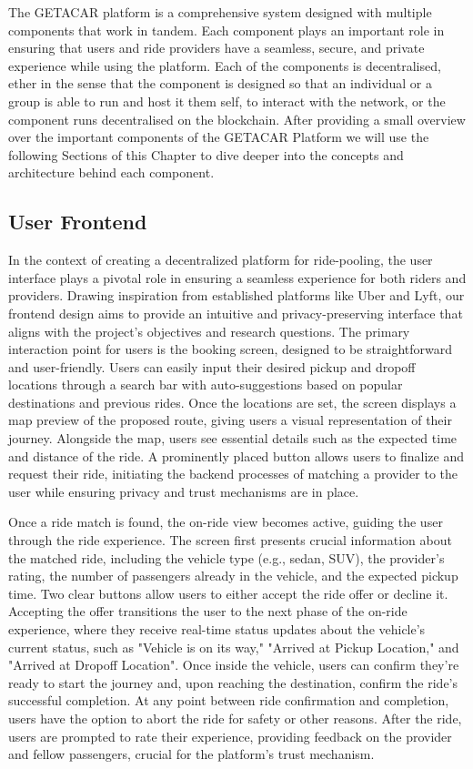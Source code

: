 The GETACAR platform is a comprehensive system designed with multiple components that work in tandem. Each component plays an important role in ensuring that users and ride providers have a seamless, secure, and private experience while using the platform. Each of the components is decentralised, ether in the sense that the component is designed so that an individual or a group is able to run and host it them self, to interact with the network, or the component runs decentralised on the blockchain. After providing a small overview over the important components of the GETACAR Platform we will use the following Sections of this Chapter to dive deeper into the concepts and architecture behind each component. 

\subsection{User Frontend}
In the context of creating a decentralized platform for ride-pooling, the user interface plays a pivotal role in ensuring a seamless experience for both riders and providers. Drawing inspiration from established platforms like Uber and Lyft, our frontend design aims to provide an intuitive and privacy-preserving interface that aligns with the project's objectives and research questions. The primary interaction point for users is the booking screen, designed to be straightforward and user-friendly. Users can easily input their desired pickup and dropoff locations through a search bar with auto-suggestions based on popular destinations and previous rides. Once the locations are set, the screen displays a map preview of the proposed route, giving users a visual representation of their journey. Alongside the map, users see essential details such as the expected time and distance of the ride. A prominently placed button allows users to finalize and request their ride, initiating the backend processes of matching a provider to the user while ensuring privacy and trust mechanisms are in place.

Once a ride match is found, the on-ride view becomes active, guiding the user through the ride experience. The screen first presents crucial information about the matched ride, including the vehicle type (e.g., sedan, SUV), the provider's rating, the number of passengers already in the vehicle, and the expected pickup time. Two clear buttons allow users to either accept the ride offer or decline it. Accepting the offer transitions the user to the next phase of the on-ride experience, where they receive real-time status updates about the vehicle's current status, such as "Vehicle is on its way," "Arrived at Pickup Location," and "Arrived at Dropoff Location". Once inside the vehicle, users can confirm they're ready to start the journey and, upon reaching the destination, confirm the ride's successful completion. At any point between ride confirmation and completion, users have the option to abort the ride for safety or other reasons. After the ride, users are prompted to rate their experience, providing feedback on the provider and fellow passengers, crucial for the platform's trust mechanism.

